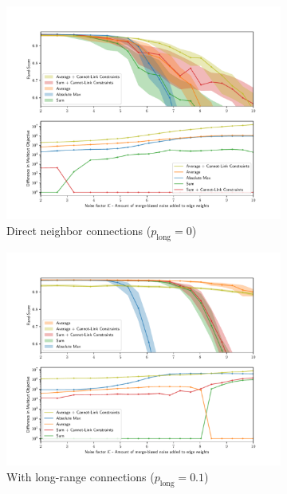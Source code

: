 % 

\begin{figure}
\centering
        \begin{subfigure}[t]{0.49 \textwidth}
        \centering
        \includegraphics[width=\textwidth,trim=0.55in 0.35in 0.65in 0.80in,clip]{./figs/merge_noise_only_direct.pdf}

        \caption{Direct neighbor connections ($p_{\mathrm{long}}=0$)} \label{fig:merge_noise_only_direct}
    \end{subfigure} \hfill
    \begin{subfigure}[t]{0.49 \textwidth}
        \centering
        \includegraphics[width=\textwidth,trim=0.53in 0.35in 0.65in 0.80in,clip]{./figs/merge_noise_long_range.pdf}
        \caption{With long-range connections ($p_{\mathrm{long}}=0.1$)} \label{fig:merge_noise_with_long_range}
    \end{subfigure}
\caption{}\label{fig:noise_plots}
\end{figure}


